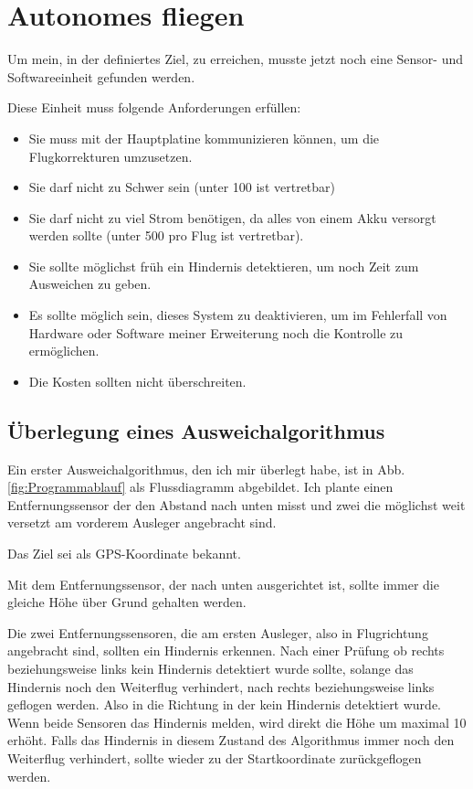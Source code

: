 \section{Autonomes fliegen}
\label{sec:autonomes_fliegen}

Um mein, in der  definiertes Ziel, zu erreichen,
musste jetzt noch eine Sensor- und Softwareeinheit gefunden werden.

Diese Einheit muss folgende Anforderungen erfüllen:
\begin{itemize}
	\item Sie muss mit der Hauptplatine kommunizieren können,
		um die Flugkorrekturen umzusetzen.
	\item Sie darf nicht zu Schwer sein (unter \unit{100}{\gram} ist vertretbar)
	\item Sie darf nicht zu viel Strom benötigen,
		da alles von einem Akku versorgt werden sollte
		(unter \unit{500}{\milli\ampere\hour} pro Flug ist vertretbar).
	\item Sie sollte möglichst früh ein Hindernis detektieren,
		um noch Zeit zum Ausweichen zu geben.
	\item Es sollte möglich sein, dieses System zu deaktivieren,
		um im Fehlerfall von Hardware oder Software meiner Erweiterung
		noch die Kontrolle zu ermöglichen.
	\item Die Kosten sollten 
		nicht überschreiten.
\end{itemize}

\subsection{Überlegung eines Ausweichalgorithmus}
Ein erster Ausweichalgorithmus, den ich mir überlegt habe, ist
in Abb. \vref{fig:Programmablauf} als Flussdiagramm abgebildet.
Ich plante einen Entfernungssensor der den
Abstand nach unten misst und zwei die möglichst weit versetzt am
vorderem Ausleger angebracht sind.

Das Ziel sei als \ac{GPS}-Koordinate bekannt.

Mit dem Entfernungssensor, der nach unten ausgerichtet ist,
sollte immer die gleiche Höhe über Grund gehalten werden.

Die zwei Entfernungssensoren, die am ersten Ausleger,
also in Flugrichtung angebracht sind,
sollten ein Hindernis erkennen.
Nach einer Prüfung ob rechts beziehungsweise links kein
Hindernis detektiert wurde sollte, solange
das Hindernis noch den Weiterflug verhindert,
nach rechts beziehungsweise links geflogen werden.
Also in die Richtung in der kein Hindernis detektiert wurde.
Wenn beide Sensoren das Hindernis melden, wird direkt
die Höhe um maximal \unit{10}{\metre} erhöht.
Falls das Hindernis in diesem Zustand des Algorithmus
immer noch den Weiterflug verhindert, sollte wieder zu
der Startkoordinate zurückgeflogen werden.

